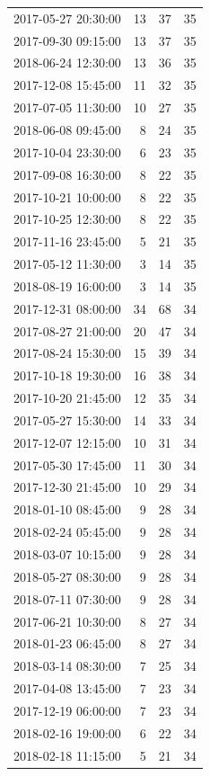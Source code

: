 \begin{tabular}{lrrr}
2017-05-27 20:30:00 & 13 & 37 & 35 \\
2017-09-30 09:15:00 & 13 & 37 & 35 \\
2018-06-24 12:30:00 & 13 & 36 & 35 \\
2017-12-08 15:45:00 & 11 & 32 & 35 \\
2017-07-05 11:30:00 & 10 & 27 & 35 \\
2018-06-08 09:45:00 & 8 & 24 & 35 \\
2017-10-04 23:30:00 & 6 & 23 & 35 \\
2017-09-08 16:30:00 & 8 & 22 & 35 \\
2017-10-21 10:00:00 & 8 & 22 & 35 \\
2017-10-25 12:30:00 & 8 & 22 & 35 \\
2017-11-16 23:45:00 & 5 & 21 & 35 \\
2017-05-12 11:30:00 & 3 & 14 & 35 \\
2018-08-19 16:00:00 & 3 & 14 & 35 \\
2017-12-31 08:00:00 & 34 & 68 & 34 \\
2017-08-27 21:00:00 & 20 & 47 & 34 \\
2017-08-24 15:30:00 & 15 & 39 & 34 \\
2017-10-18 19:30:00 & 16 & 38 & 34 \\
2017-10-20 21:45:00 & 12 & 35 & 34 \\
2017-05-27 15:30:00 & 14 & 33 & 34 \\
2017-12-07 12:15:00 & 10 & 31 & 34 \\
2017-05-30 17:45:00 & 11 & 30 & 34 \\
2017-12-30 21:45:00 & 10 & 29 & 34 \\
2018-01-10 08:45:00 & 9 & 28 & 34 \\
2018-02-24 05:45:00 & 9 & 28 & 34 \\
2018-03-07 10:15:00 & 9 & 28 & 34 \\
2018-05-27 08:30:00 & 9 & 28 & 34 \\
2018-07-11 07:30:00 & 9 & 28 & 34 \\
2017-06-21 10:30:00 & 8 & 27 & 34 \\
2018-01-23 06:45:00 & 8 & 27 & 34 \\
2018-03-14 08:30:00 & 7 & 25 & 34 \\
2017-04-08 13:45:00 & 7 & 23 & 34 \\
2017-12-19 06:00:00 & 7 & 23 & 34 \\
2018-02-16 19:00:00 & 6 & 22 & 34 \\
2018-02-18 11:15:00 & 5 & 21 & 34 \\

\end{tabular}

